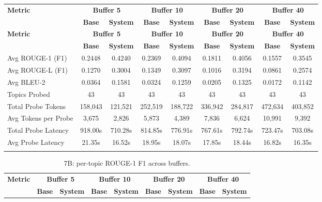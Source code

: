 \begin{landscape}
\begin{longtable}{@{}p{3.8cm}cccccccc@{}}
\toprule
\textbf{Metric} & \multicolumn{2}{c}{\textbf{Buffer 5}} & \multicolumn{2}{c}{\textbf{Buffer 10}} & \multicolumn{2}{c}{\textbf{Buffer 20}} & \multicolumn{2}{c}{\textbf{Buffer 40}} \\
\cmidrule(lr){2-3}\cmidrule(lr){4-5}\cmidrule(lr){6-7}\cmidrule(lr){8-9}
 & \textbf{Base} & \textbf{System} & \textbf{Base} & \textbf{System} & \textbf{Base} & \textbf{System} & \textbf{Base} & \textbf{System} \\
\midrule
\endfirsthead

\toprule
\textbf{Metric} & \multicolumn{2}{c}{\textbf{Buffer 5}} & \multicolumn{2}{c}{\textbf{Buffer 10}} & \multicolumn{2}{c}{\textbf{Buffer 20}} & \multicolumn{2}{c}{\textbf{Buffer 40}} \\
\cmidrule(lr){2-3}\cmidrule(lr){4-5}\cmidrule(lr){6-7}\cmidrule(lr){8-9}
 & \textbf{Base} & \textbf{System} & \textbf{Base} & \textbf{System} & \textbf{Base} & \textbf{System} & \textbf{Base} & \textbf{System} \\
\midrule
\endhead
Avg ROUGE-1 (F1) & 0.2448 & 0.4240 & 0.2369 & 0.4094 & 0.1811 & 0.4056 & 0.1557 & 0.3545 \\
Avg ROUGE-L (F1) & 0.1270 & 0.3004 & 0.1349 & 0.3097 & 0.1016 & 0.3194 & 0.0861 & 0.2574 \\
Avg BLEU-2 & 0.0364 & 0.1581 & 0.0324 & 0.1259 & 0.0205 & 0.1325 & 0.0172 & 0.1142 \\
Topics Probed & 43 & 43 & 43 & 43 & 43 & 43 & 43 & 43 \\
Total Probe Tokens & 158,043 & 121,521 & 252,519 & 188,722 & 336,942 & 284,817 & 472,634 & 403,852 \\
Avg Tokens per Probe & 3,675 & 2,826 & 5,873 & 4,389 & 7,836 & 6,624 & 10,991 & 9,392 \\
Total Probe Latency & 918.00s & 710.28s & 814.85s & 776.91s & 767.61s & 792.74s & 723.47s & 703.08s \\
Avg Probe Latency & 21.35s & 16.52s & 18.95s & 18.07s & 17.85s & 18.44s & 16.82s & 16.35s \\
\botrule
\end{longtable}
\begin{longtable}{@{}p{3.8cm}cccccccc@{}}
\caption{7B: per-topic ROUGE-1 F1 across buffers.}\label{tab:app_7b_rouge1_topics}\\

\toprule
\textbf{Metric} & \multicolumn{2}{c}{\textbf{Buffer 5}} & \multicolumn{2}{c}{\textbf{Buffer 10}} & \multicolumn{2}{c}{\textbf{Buffer 20}} & \multicolumn{2}{c}{\textbf{Buffer 40}} \\
\cmidrule(lr){2-3}\cmidrule(lr){4-5}\cmidrule(lr){6-7}\cmidrule(lr){8-9}
 & \textbf{Base} & \textbf{System} & \textbf{Base} & \textbf{System} & \textbf{Base} & \textbf{System} & \textbf{Base} & \textbf{System} \\
\midrule
\endfirsthead


\end{longtable}
\end{landscape}
